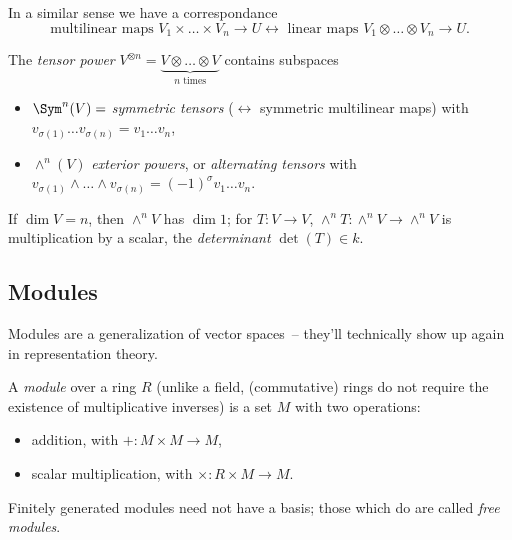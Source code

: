 \documentclass{notes}
\begin{document}
\begin{defn}
    In a similar sense we have a correspondance
    \[
    \text{multilinear maps } V_1 \times \ldots \times V_n\to U \leftrightarrow \text{ linear maps } V_1\otimes \ldots \otimes V_n \to U
    .\]  
\end{defn}

\begin{theorem}
    The \emph{tensor power} $V^{\otimes n}=\underbrace{V\otimes \ldots \otimes V}_{n\text{ times}}$ contains subspaces
    \begin{itemize}
        \item $\Sym ^{n}(V)=$ \emph{symmetric tensors} ($\leftrightarrow $ symmetric multilinear maps) with $v_{\sigma(1)}\ldots v_{\sigma(n)}=v_1\ldots v_n$,
        \item $\wedge^n (V)$ \emph{exterior powers}, or \emph{alternating tensors} with $v_{\sigma(1)}\wedge\ldots \wedge v_{\sigma(n)}=(-1)^{\sigma}v_1\ldots v_n$.
    \end{itemize}
\end{theorem}

\begin{theorem}
    If $\dim V=n$, then $\wedge^n V$ has $\dim 1$; for $T\colon V \to V$, $\wedge^nT\colon\wedge^nV\to \wedge^nV$ is multiplication by a scalar, the \emph{determinant}  $\det(T)\in k$. 
\end{theorem}

\subsection{Modules}

Modules are a generalization of vector spaces – they'll technically show up again in representation theory.

\begin{defn}
    A \emph{module} over a ring $R$ (unlike a field, (commutative) rings do not require the existence of multiplicative inverses) is a set $M$ with two operations:
    \begin{itemize}
        \item addition, with $+\colon M\times M \to M $,
        \item scalar multiplication, with $\times \colon R\times M \to M $.
    \end{itemize}
\end{defn}

\begin{theorem}
    Finitely generated modules need not have a basis; those which do are called \emph{free modules}.
\end{theorem}
\end{document}
